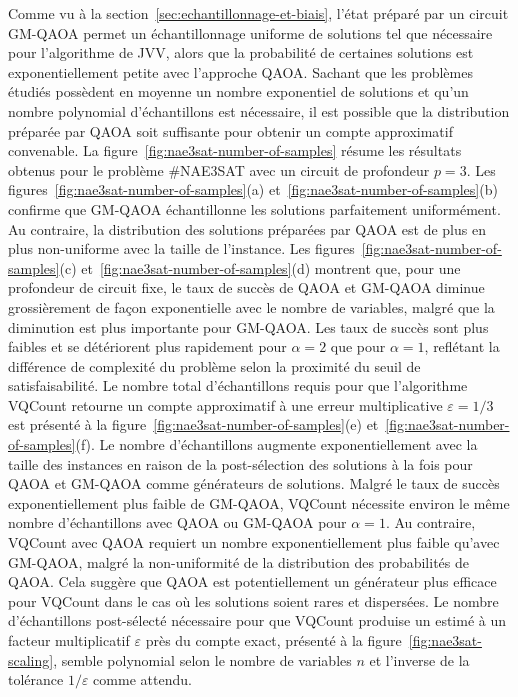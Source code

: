 Comme vu à la section~\ref{sec:echantillonnage-et-biais}, l'état préparé par un circuit GM-QAOA permet un échantillonnage uniforme de solutions tel que nécessaire pour l'algorithme de JVV, alors que la probabilité de certaines solutions est exponentiellement petite avec l'approche QAOA. Sachant que les problèmes étudiés possèdent en moyenne un nombre exponentiel de solutions et qu'un nombre polynomial d'échantillons est nécessaire, il est possible que la distribution préparée par QAOA soit suffisante pour obtenir un compte approximatif convenable. La figure~\ref{fig:nae3sat-number-of-samples} résume les résultats obtenus pour le problème \#NAE3SAT avec un circuit de profondeur $p=3$. Les figures~\ref{fig:nae3sat-number-of-samples}(a) et~\ref{fig:nae3sat-number-of-samples}(b) confirme que GM-QAOA échantillonne les solutions parfaitement uniformément. Au contraire, la distribution des solutions préparées par QAOA est de plus en plus non-uniforme avec la taille de l'instance. Les figures~\ref{fig:nae3sat-number-of-samples}(c) et~\ref{fig:nae3sat-number-of-samples}(d) montrent que, pour une profondeur de circuit fixe, le taux de succès de QAOA et GM-QAOA diminue grossièrement de façon exponentielle avec le nombre de variables, malgré que la diminution est plus importante pour GM-QAOA. Les taux de succès sont plus faibles et se détériorent plus rapidement pour $\alpha = 2$ que pour $\alpha=1$, reflétant la différence de complexité du problème selon la proximité du seuil de satisfaisabilité. Le nombre total d'échantillons requis pour que l'algorithme VQCount retourne un compte approximatif à une erreur multiplicative $\varepsilon = 1/3$ est présenté à la figure~\ref{fig:nae3sat-number-of-samples}(e) et~\ref{fig:nae3sat-number-of-samples}(f). Le nombre d'échantillons augmente exponentiellement avec la taille des instances en raison de la post-sélection des solutions à la fois pour QAOA et GM-QAOA comme générateurs de solutions. Malgré le taux de succès exponentiellement plus faible de GM-QAOA, VQCount nécessite environ le même nombre d'échantillons avec QAOA ou GM-QAOA pour $\alpha=1$. Au contraire, VQCount avec QAOA requiert un nombre exponentiellement plus faible qu'avec GM-QAOA, malgré la non-uniformité de la distribution des probabilités de QAOA. Cela suggère que QAOA est potentiellement un générateur plus efficace pour VQCount dans le cas où les solutions soient rares et dispersées. Le nombre d'échantillons post-sélecté nécessaire pour que VQCount produise un estimé à un facteur multiplicatif $\varepsilon$ près du compte exact, présenté à la figure~\ref{fig:nae3sat-scaling}, semble polynomial selon le nombre de variables $n$ et l'inverse de la tolérance $1/\varepsilon$ comme attendu.

